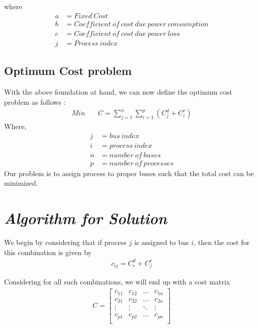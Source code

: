\documentclass[12pt, twocolumn]{extreport}
\begin{document}
	 where \begin{equation*}
	 \begin{aligned}
	 a &= Fixed \: Cost \\ b &= \mathit{Coefficient \: of \: cost \: due \: power \: consumption } \\
	 c &= \mathit{Coefficient \: of \: cost \: due \: power \: loss} \\
	 j &= \mathit{Process \: index}
	 \end{aligned}
	 \end{equation*}
	 
	 \subsection[Optimum Cost problem]{Optimum Cost problem} With the above foundation at hand, we can now define the optimum cost problem as follows :
	 \begin{align}
	 Min \quad &C = \sum_{j=1}^{n}\sum_{i=1}^{p}( C^{d}_{j}+C^{r}_{i})
	 \label{eq:total_cost_sum} 
	 \end{align} 
	 Where, \begin{align*}
	 j &= bus \: index \\
	 i &= process \: index \\
	 n &= number \: of \: buses \\
	 p &= number \: of \: processes
	 \end{align*}
	  Our problem is to assign process to proper buses such that the total cost can be minimized.
	 \section[Algorithm For solution]{\textit{Algorithm for Solution}} 
	 We begin by considering that if process $ j $ is assigned to bus $ i $, then the cost for this combination is given by \begin{align}
		 c_{ij} = C^{d}_{i}+C^{r}_{j}
	 \end{align}
	 
	 Considering for all such combinations, we will end up with a cost matrix \begin{align}
	 C = \begin{bmatrix}
	 c_{11} & c_{12} & \ldots & c_{1n} \\
	 c_{21} & c_{22} & \ldots & c_{2n} \\
	 \vdots & \vdots &\ddots   & \vdots \\
	 c_{p1} & c_{p2} & \ldots & c_{pn} \\
	 \end{bmatrix}
	 \label{eq:cost_matrix}
	 \end{align}
	 
\end{document}
